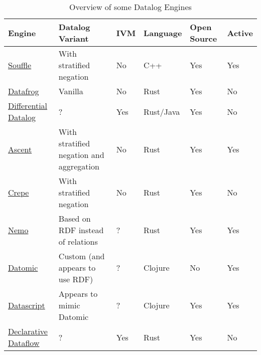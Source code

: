 \documentclass{article}
\begin{document}
\begin{table*}[]
    \center
    \small
    \begin{tabular}{@{}lp{3.4cm}lp{1.2cm}p{0.7cm}l@{}}
        \toprule
        Engine                                                                      & Datalog Variant                          & IVM & Language  & Open Source & Active \\
        \midrule
        \href{https://github.com/souffle-lang/souffle}{Souffle}                     & With stratified negation                 & No  & C++       & Yes         & Yes    \\
        \href{https://github.com/rust-lang/datafrog}{Datafrog}                      & Vanilla                                  & No  & Rust      & Yes         & No     \\
        \href{https://github.com/vmware/differential-datalog}{Differential Datalog} & ?                                        & Yes & Rust/Java & Yes         & No     \\
        \href{https://github.com/s-arash/ascent/}{Ascent}                           & With stratified negation and aggregation & No  & Rust      & Yes         & Yes    \\
        \href{https://github.com/ekzhang/crepe}{Crepe}                              & With stratified negation                 & No  & Rust      & Yes         & No     \\
        \href{https://github.com/knowsys/nemo}{Nemo}                                & Based on RDF instead of relations        & ?   & Rust      & Yes         & Yes    \\
        \href{https://www.datomic.com}{Datomic}                                     & Custom (and appears to use RDF)          & ?   & Clojure   & No          & Yes    \\
        \href{https://github.com/tonsky/datascript}{Datascript}                     & Appears to mimic Datomic                 & ?   & Clojure   & Yes         & Yes    \\
        \href{https://github.com/comnik/declarative-dataflow}{Declarative Dataflow} & ?                                        & Yes & Rust      & Yes         & No     \\
        \bottomrule
    \end{tabular}
    \caption{Overview of some Datalog Engines}
    \label{tab:datalog-engines}
\end{table*}

\pagebreak{}
\printbibliography{}
\end{document}
